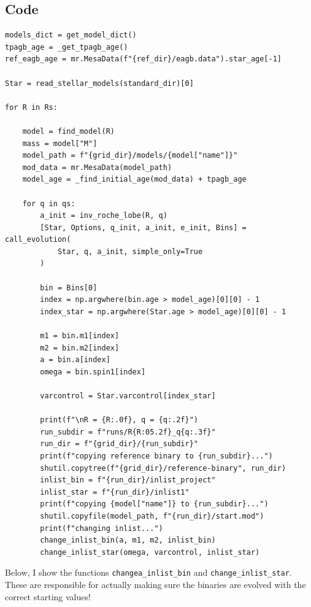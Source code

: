 \documentclass[a4paper,10pt]{article}
\begin{document}
\subsection{Code}
\begin{verbatim}
models_dict = get_model_dict()
tpagb_age = _get_tpagb_age()
ref_eagb_age = mr.MesaData(f"{ref_dir}/eagb.data").star_age[-1]

Star = read_stellar_models(standard_dir)[0]

for R in Rs:

    model = find_model(R)
    mass = model["M"]
    model_path = f"{grid_dir}/models/{model["name"]}"
    mod_data = mr.MesaData(model_path)
    model_age = _find_initial_age(mod_data) + tpagb_age

    for q in qs:
        a_init = inv_roche_lobe(R, q)
        [Star, Options, q_init, a_init, e_init, Bins] = call_evolution(
            Star, q, a_init, simple_only=True
        )

        bin = Bins[0]
        index = np.argwhere(bin.age > model_age)[0][0] - 1
        index_star = np.argwhere(Star.age > model_age)[0][0] - 1

        m1 = bin.m1[index]
        m2 = bin.m2[index]
        a = bin.a[index]
        omega = bin.spin1[index]

        varcontrol = Star.varcontrol[index_star]

        print(f"\nR = {R:.0f}, q = {q:.2f}")
        run_subdir = f"runs/R{R:05.2f}_q{q:.3f}"
        run_dir = f"{grid_dir}/{run_subdir}"
        print(f"copying reference binary to {run_subdir}...")
        shutil.copytree(f"{grid_dir}/reference-binary", run_dir)
        inlist_bin = f"{run_dir}/inlist_project"
        inlist_star = f"{run_dir}/inlist1"
        print(f"copying {model["name"]} to {run_subdir}...")
        shutil.copyfile(model_path, f"{run_dir}/start.mod")
        print(f"changing inlist...")
        change_inlist_bin(a, m1, m2, inlist_bin)
        change_inlist_star(omega, varcontrol, inlist_star)
\end{verbatim}
Below, I show the functions \lstinline[style=output, breaklines=true]|changea_inlist_bin| and \lstinline[style=output, breaklines=true]|change_inlist_star|. These are responsible for actually making sure the binaries are evolved with the correct starting values!
\end{document}
